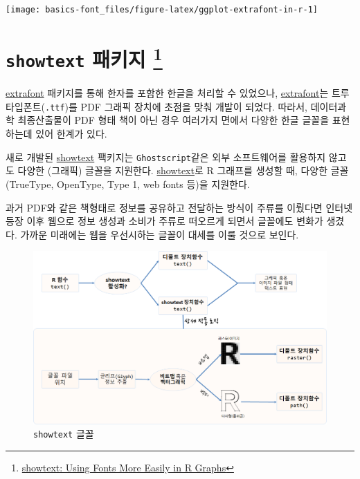 \documentclass[
]{book}
\begin{document}
\begin{center}\texttt{[image: basics-font\_files/figure-latex/ggplot-extrafont-in-r-1]} \end{center}

\hypertarget{font-showtext}{%
\section[\texttt{showtext} 패키지 ]{\texorpdfstring{\texttt{showtext} 패키지 \footnote{\href{https://cran.rstudio.com/web/packages/showtext/index.html}{showtext: Using Fonts More Easily in R
  Graphs}}}{showtext 패키지 }}\label{font-showtext}}

\href{https://github.com/wch/extrafont}{extrafont} 패키지를 통해 한자를
포함한 한글을 처리할 수 있었으나, \href{https://github.com/wch/extrafont}{extrafont}는 트루타입폰트(\texttt{.ttf})를
PDF 그래픽 장치에 초점을 맞춰 개발이 되었다. 따라서, 데이터과학
최종산출물이 PDF 형태 책이 아닌 경우 여러가지 면에서 다양한 한글 글꼴을
표현하는데 있어 한계가 있다.

새로 개발된 \href{https://cran.rstudio.com/web/packages/showtext/index.html}{showtext}
팩키지는 \texttt{Ghostscript}같은 외부 소프트웨어를 활용하지 않고도 다양한
(그래픽) 글꼴을 지원한다. \href{https://cran.rstudio.com/web/packages/showtext/index.html}{showtext}로
R 그래프를 생성할 때, 다양한 글꼴(TrueType, OpenType, Type 1, web fonts
등)을 지원한다.

과거 PDF와 같은 책형태로 정보를 공유하고 전달하는 방식이 주류를 이뤘다면
인터넷 등장 이후 웹으로 정보 생성과 소비가 주류로 떠오르게 되면서 글꼴에도
변화가 생겼다. 가까운 미래에는 웹을 우선시하는 글꼴이 대세를 이룰 것으로 보인다.

\begin{figure}
\centering
\includegraphics[width=1\textwidth,height=\textheight]{assets/images/font-showtext.png}
\caption{\texttt{showtext} 글꼴}
\end{figure}
\end{document}
